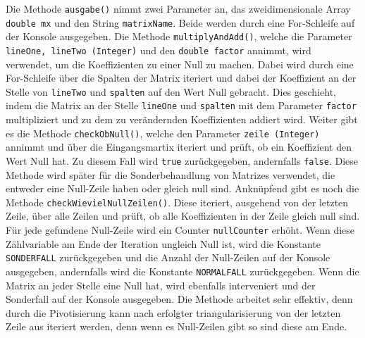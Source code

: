 \documentclass[a4paper, 12pt]{report}
\begin{document}
Die Methode \texttt{ausgabe()} nimmt zwei Parameter an, das zweidimensionale Array \texttt{double mx}
und den String \texttt{matrixName}. Beide werden durch eine For-Schleife auf der Konsole ausgegeben.
Die Methode \texttt{multiplyAndAdd()}, welche die Parameter \texttt{lineOne, lineTwo (Integer)}
und den \texttt{double factor} annimmt, wird verwendet, um die Koeffizienten zu einer Null zu machen.
Dabei wird durch eine For-Schleife über die Spalten der Matrix iteriert
und dabei der Koeffizient an der Stelle von \texttt{lineTwo} und \texttt{spalten} auf den Wert Null gebracht.
Dies geschieht, indem die Matrix an der Stelle \texttt{lineOne} und \texttt{spalten} mit dem Parameter \texttt{factor} multipliziert
und zu dem zu verändernden Koeffizienten addiert wird.
Weiter gibt es die Methode \texttt{checkObNull()}, welche den Parameter \texttt{zeile (Integer)} annimmt
und über die Eingangsmartix iteriert und prüft, ob ein Koeffizient den Wert Null hat. Zu diesem Fall wird
\texttt{true} zurückgegeben, andernfalls \texttt{false}.
Diese Methode wird später für die Sonderbehandlung von Matrizes verwendet, die entweder eine Null-Zeile haben oder gleich null sind.
Anknüpfend gibt es noch die Methode \texttt{checkWievielNullZeilen()}. Diese iteriert, ausgehend von der letzten Zeile,
über alle Zeilen und prüft, ob alle Koeffizienten in der Zeile gleich null sind. Für jede gefundene Null-Zeile wird ein Counter
\texttt{nullCounter} erhöht. Wenn diese Zählvariable am Ende der Iteration ungleich Null ist, wird die Konstante \texttt{SONDERFALL} zurückgegeben
und die Anzahl der Null-Zeilen auf der Konsole ausgegeben, andernfalls wird die Konstante \texttt{NORMALFALL} zurückgegeben.
Wenn die Matrix an jeder Stelle eine Null hat, wird ebenfalls interveniert und der Sonderfall auf der Konsole ausgegeben.
Die Methode arbeitet sehr effektiv, denn durch die Pivotisierung kann nach erfolgter triangularisierung von der letzten Zeile aus iteriert werden, denn
wenn es Null-Zeilen gibt so sind diese am Ende.
\end{document}

